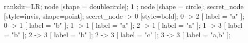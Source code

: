 \documentclass{article}
\begin{document}
 {  rankdir=LR;
  node [shape = doublecircle]; 1 ;
  node [shape = circle];
  secret_node [style=invis, shape=point];
  secret_node -> 0 [style=bold];
  0 -> 2 [ label = "a"  ];
  0 -> 1 [ label = "b"  ];
  1 -> 1 [ label = "a"  ];
  2 -> 1 [ label = "a"  ];
  1 -> 3 [ label = "b"  ];
  2 -> 3 [ label = "b"  ];
  2 -> 3 [ label = "c"  ];
  3 -> 3 [ label = "a,b"  ];}
\end{document}
